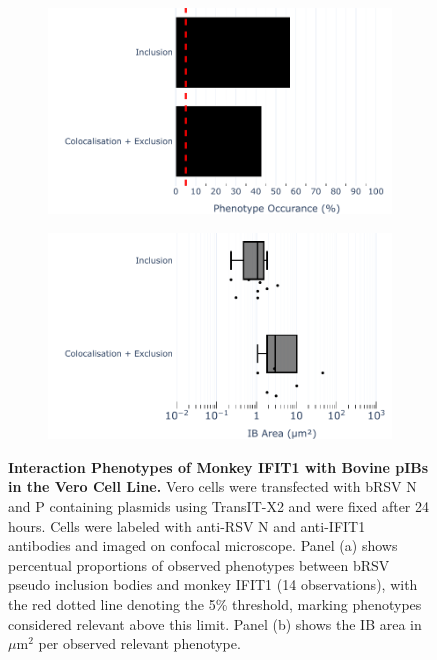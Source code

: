 \begin{figure}
    \begin{subfigure}{0.495\textwidth}
        \caption{}
        \includegraphics[width=1\linewidth]{09. Chapter 4/Figs/01. pIB/02. IFIT1/07. bar_i1_vero_bnbp.pdf}  
    \end{subfigure}
    \begin{subfigure}{0.495\textwidth}
        \caption{}
        \includegraphics[width=1\linewidth]{09. Chapter 4/Figs/01. pIB/02. IFIT1/08. box_i1_vero_bnbp.pdf}
    \end{subfigure}
    \caption[Interaction Phenotypes of Monkey IFIT1 with Bovine pIBs in the Vero Cell Line.]{\textbf{Interaction Phenotypes of Monkey IFIT1 with Bovine pIBs in the Vero Cell Line.} Vero cells were transfected with bRSV N and P containing plasmids using TransIT-X2 and were fixed after 24 hours. Cells were labeled with anti-RSV N and anti-IFIT1 antibodies and imaged on confocal microscope. Panel (a) shows percentual proportions of observed phenotypes between bRSV pseudo inclusion bodies and monkey IFIT1 (14 observations), with the red dotted line denoting the 5\% threshold, marking phenotypes considered relevant above this limit. Panel (b) shows the IB area in \(\mu \mbox{m}^2\) per observed relevant phenotype.}
    \label{fig:Interaction Phenotypes of Monkey IFIT1 with Bovine pIBs in the VERO Cell Line}
\end{figure}

